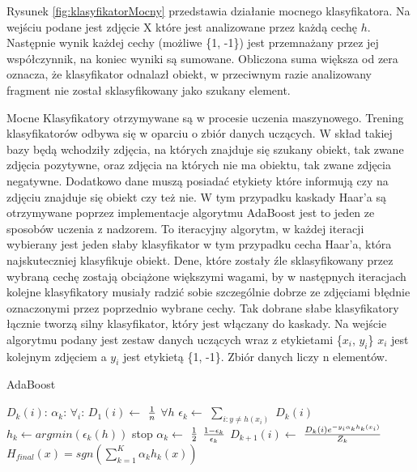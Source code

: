 Rysunek \ref{fig:klasyfikatorMocny} przedstawia działanie mocnego klasyfikatora. Na wejściu podane jest zdjęcie X które jest analizowane przez każdą cechę $h$. Następnie wynik każdej cechy (możliwe \{1, -1\}) jest przemnażany przez jej współczynnik, na koniec wyniki są sumowane. Obliczona suma większa od zera oznacza, że klasyfikator odnalazł obiekt, w przeciwnym razie analizowany fragment nie został sklasyfikowany jako szukany element.

Mocne Klasyfikatory otrzymywane są w procesie uczenia maszynowego. Trening klasyfikatorów odbywa się w oparciu o zbiór danych uczących. W skład takiej bazy będą wchodziły zdjęcia, na których znajduje się szukany obiekt, tak zwane zdjęcia pozytywne, oraz zdjęcia na których nie ma obiektu, tak zwane zdjęcia negatywne. Dodatkowo dane muszą posiadać etykiety które informują czy na zdjęciu znajduje się obiekt czy też nie. W tym przypadku kaskady Haar’a są otrzymywane poprzez implementacje algorytmu AdaBoost jest to jeden ze sposobów uczenia z nadzorem. To iteracyjny algorytm, w każdej iteracji wybierany  jest jeden słaby klasyfikator w tym przypadku cecha Haar’a, która najskuteczniej klasyfikuje obiekt. Dene, które zostały źle sklasyfikowany przez wybraną cechę zostają obciążone większymi wagami, by w następnych iteracjach kolejne klasyfikatory musiały radzić sobie szczególnie dobrze ze zdjęciami błędnie oznaczonymi przez poprzednio wybrane cechy. Tak dobrane słabe klasyfikatory łącznie tworzą silny klasyfikator, który jest włączany do kaskady. Na wejście algorytmu podany jest zestaw danych uczących wraz z etykietami \{$x_{i}$, $y_{i}$\} $x_{i}$ jest kolejnym zdjęciem a $y_{i}$ jest etykietą \{1, -1\}. Zbiór danych liczy n elementów.

\begin{algorithm}[H]
\caption{AdaBoost}\label{adaBoost}
\begin{algorithmic} 
\DontPrintSemicolon
\STATE $D_k(i)$: 
\STATE $\alpha_k$:
\STATE $\forall_i$: $D_1(i) \gets$ ${1} \over {n}$ 
\STATE $\forall h$ $\epsilon_k \gets$ $\sum_{i:y\neq h(x_i)}^{} $ $D_k(i)$ 
\STATE $h_k \gets argmin(\epsilon_k(h))$ 
\STATE stop 
\ELSE
\STATE $\alpha_k \gets $ $1 \over 2$ $1- \epsilon_k \over \epsilon_k$
\STATE $D_{k+1}(i) \gets$ $D_k(i)e^{-y_i\alpha_k h_k(x_i)} \over Z_k$
\ENDIF
\ENDFOR
\STATE $H_{final}(x) = sgn(\sum_{k=1}^{K} \alpha_k h_k(x))$
\end{algorithmic}
\end{algorithm}

